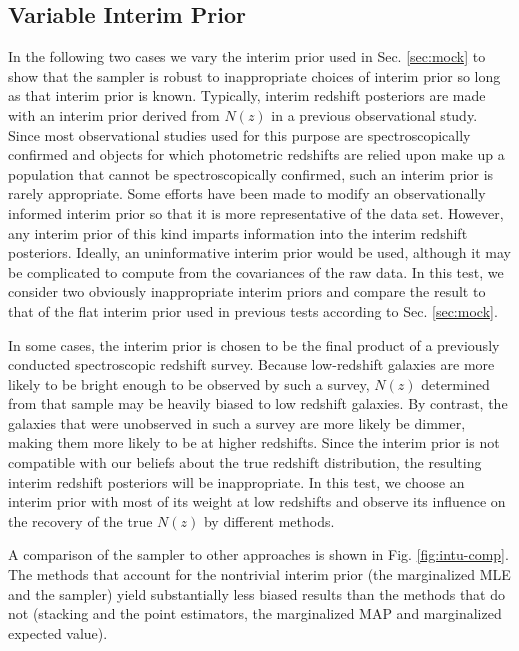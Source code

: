 \documentclass[preprint]{aastex}
\begin{document}
\clearpage
\subsection{Variable Interim Prior}
\label{sec:interim}

In the following two cases we vary the interim prior used in Sec. 
\ref{sec:mock} to show that the sampler is robust to inappropriate choices of 
interim prior so long as that interim prior is known.  Typically, interim 
redshift posteriors are made with an interim prior derived from $N(z)$ in a 
previous observational study.  Since most observational studies used for this 
purpose are spectroscopically confirmed and objects for which photometric 
redshifts are relied upon make up a population that cannot be spectroscopically 
confirmed, such an interim prior is rarely appropriate.  Some efforts have been 
made to modify an observationally informed interim prior so that it is more 
representative of the data set.  \citep{Sheldon2012}  However, any interim 
prior of this kind imparts information into the interim redshift posteriors.  
Ideally, an uninformative interim prior would be used, although it may be 
complicated to compute from the covariances of the raw data.  In this test, we 
consider two obviously inappropriate interim priors and compare the result to 
that of the flat interim prior used in previous tests according to Sec. 
\ref{sec:mock}.

In some cases, the interim prior is chosen to be the final product of a 
previously conducted spectroscopic redshift survey.  Because low-redshift 
galaxies are more likely to be bright enough to be observed by such a survey, 
$N(z)$ determined from that sample may be heavily biased to low redshift 
galaxies.  By contrast, the galaxies that were unobserved in such a survey are 
more likely be dimmer, making them more likely to be at higher redshifts.  
Since the interim prior is not compatible with our beliefs about the true 
redshift distribution, the resulting interim redshift posteriors will be 
inappropriate.  In this test, we choose an interim prior with most of its 
weight at low redshifts and observe its influence on the recovery of the true 
$N(z)$ by different methods.  

A comparison of the sampler to other approaches is shown in Fig. 
\ref{fig:intu-comp}.  The methods that account for the nontrivial interim prior 
(the marginalized MLE and the sampler) yield substantially less biased results 
than the methods that do not (stacking and the point estimators, the 
marginalized MAP and marginalized expected value).
\end{document}
